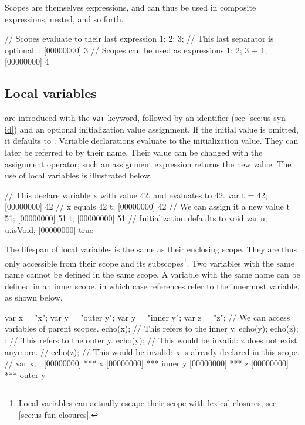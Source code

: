 Scopes are themselves expressions, and can thus be used in composite
expressions, nested, and so forth.

\begin{urbiscript}[firstnumber=last]
// Scopes evaluate to their last expression
{
  1;
  2;
  3; // This last separator is optional.
};
[00000000] 3
// Scopes can be used as expressions
{1; 2; 3} + 1;
[00000000] 4
\end{urbiscript}

\subsection{Local variables}

 are introduced with the \lstinline|var| keyword,
followed by an identifier (see \autoref{sec:us-syn-id}) and an optional
initialization value assignment. If the initial value is omitted, it
defaults to . Variable
declarations evaluate to
the initialization value. They can later be referred to by their
name. Their value can be changed with the assignment operator; such an
assignment expression returns the new value. The use of local
variables is illustrated below.

\begin{urbiscript}[firstnumber=last]
// This declare variable x with value 42, and evaluates to 42.
var t = 42;
[00000000] 42
// x equals 42
t;
[00000000] 42
// We can assign it a new value
t = 51;
[00000000] 51
t;
[00000000] 51
// Initialization defaults to void
var u;
u.isVoid;
[00000000] true
\end{urbiscript}

The lifespan of local variables is the same as their enclosing scope. They
are thus only accessible from their scope and its
subscopes\footnote{Local variables can actually escape their scope
  with lexical closures, see \autoref{sec:us-fun-closures}.}. Two
variables with the same name cannot be defined in the same scope. A
variable with the same name can be defined in an inner scope, in which
case references refer to the innermost variable, as shown below.

\begin{urbiscript}[firstnumber=last]
{
  var x = "x";
  var y = "outer y";
  {
    var y = "inner y";
    var z = "z";
    // We can access variables of parent scopes.
    echo(x);
    // This refers to the inner y.
    echo(y);
    echo(z);
  };
  // This refers to the outer y.
  echo(y);
  // This would be invalid: z does not exist anymore.
  // echo(z);
  // This would be invalid: x is already declared in this scope.
  // var x;
};
[00000000] *** x
[00000000] *** inner y
[00000000] *** z
[00000000] *** outer y
\end{urbiscript}


